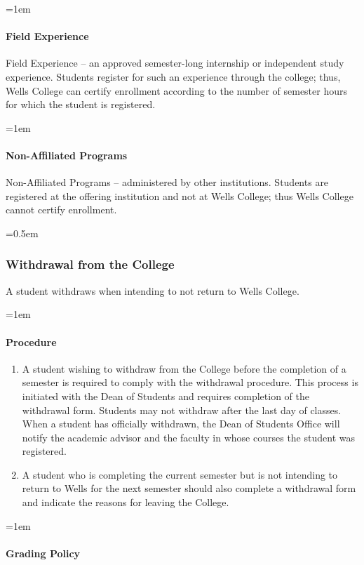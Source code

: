 \documentclass{manual}
\let\oldsubsubsection\subsubsection
\renewcommand\subsubsection{\leftskip=0.5em\oldsubsubsection}
\let\oldparagraph\paragraph
\renewcommand\paragraph{\leftskip=1em\oldparagraph}
\begin{document}
\paragraph{Field Experience}
Field Experience -- an approved semester-long internship or independent study experience. Students register for such an experience through the college; thus, Wells College can certify enrollment according to the number of semester hours for which the student is registered.

\paragraph{Non-Affiliated Programs}
Non-Affiliated Programs -- administered by other institutions. Students are registered at the offering institution and not at Wells College; thus Wells College cannot certify enrollment.

\subsubsection{Withdrawal from the College}\label{sub:WithdrawlFromTheCollege}

A student withdraws when intending to not return to Wells College.

\paragraph{Procedure}
\begin{enumerate}[label=\alph*)]
\item A student wishing to withdraw from the College before the completion of a semester is required to comply with the withdrawal procedure. This process is initiated with the Dean of Students and requires completion of the withdrawal form. Students may not withdraw after the last day of classes. When a student has officially withdrawn, the Dean of Students Office will notify the academic advisor and the faculty in whose courses the student was registered.

\item A student who is completing the current semester but is not intending to return to Wells for the next semester should also complete a withdrawal form and indicate the reasons for leaving the College.
\end{enumerate}
\paragraph{Grading Policy}
\end{document}
